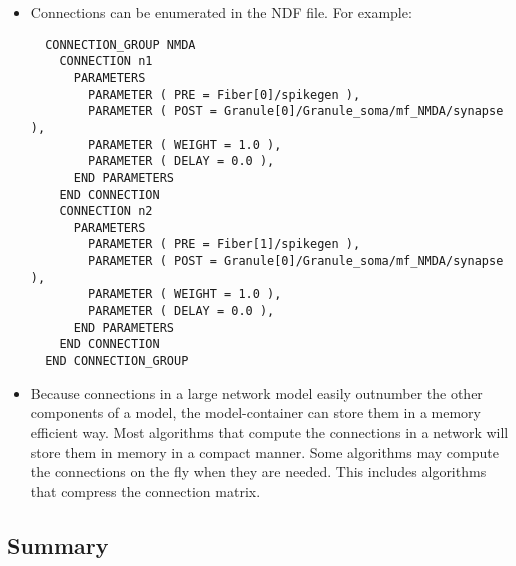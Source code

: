 \documentclass[12pt]{article}
\begin{document}
\begin{itemize}
\item Connections can be enumerated in the NDF file.  For example:
\begin{verbatim}
  CONNECTION_GROUP NMDA
    CONNECTION n1
      PARAMETERS
        PARAMETER ( PRE = Fiber[0]/spikegen ),
        PARAMETER ( POST = Granule[0]/Granule_soma/mf_NMDA/synapse ),
        PARAMETER ( WEIGHT = 1.0 ),
        PARAMETER ( DELAY = 0.0 ),
      END PARAMETERS
    END CONNECTION
    CONNECTION n2
      PARAMETERS
        PARAMETER ( PRE = Fiber[1]/spikegen ),
        PARAMETER ( POST = Granule[0]/Granule_soma/mf_NMDA/synapse ),
        PARAMETER ( WEIGHT = 1.0 ),
        PARAMETER ( DELAY = 0.0 ),
      END PARAMETERS
    END CONNECTION
  END CONNECTION_GROUP
\end{verbatim}
\item Because connections in a large network model easily outnumber
  the other components of a model, the model-container can store them
  in a memory efficient way.  Most algorithms that compute the
  connections in a network will store them in memory in a compact
  manner.  Some algorithms may compute the connections on the fly when
  they are needed.  This includes algorithms that compress the
  connection matrix.
\end{itemize}



\subsection*{Summary}
\end{document}
